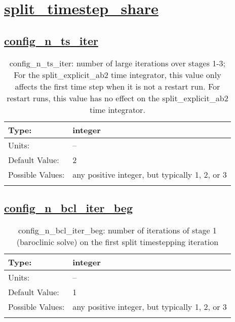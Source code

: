 \section[split\_timestep\_share]{\hyperref[sec:nm_tab_split_timestep_share]{split\_timestep\_share}}
\label{sec:nm_sec_split_timestep_share}
\subsection[config\_n\_ts\_iter]{\hyperref[sec:nm_tab_split_timestep_share]{config\_n\_ts\_iter}}
\label{subsec:nm_sec_config_n_ts_iter}
\begin{center}
\begin{longtable}{| p{2.0in} || p{4.0in} |}
    \hline
    Type: & integer \\
    \hline
    Units: & -- \\
    \hline
    Default Value: & 2 \\
    \hline
    Possible Values: & any positive integer, but typically 1, 2, or 3 \\
    \hline
    \caption{config\_n\_ts\_iter: number of large iterations over stages 1-3; For the split\_explicit\_ab2 time integrator, this value only affects the first time step when it is not a restart run. For restart runs, this value has no effect on the split\_explicit\_ab2 time integrator.}
\end{longtable}
\end{center}
\subsection[config\_n\_bcl\_iter\_beg]{\hyperref[sec:nm_tab_split_timestep_share]{config\_n\_bcl\_iter\_beg}}
\label{subsec:nm_sec_config_n_bcl_iter_beg}
\begin{center}
\begin{longtable}{| p{2.0in} || p{4.0in} |}
    \hline
    Type: & integer \\
    \hline
    Units: & -- \\
    \hline
    Default Value: & 1 \\
    \hline
    Possible Values: & any positive integer, but typically 1, 2, or 3 \\
    \hline
    \caption{config\_n\_bcl\_iter\_beg: number of iterations of stage 1 (baroclinic solve) on the first split timestepping iteration}
\end{longtable}
\end{center}
